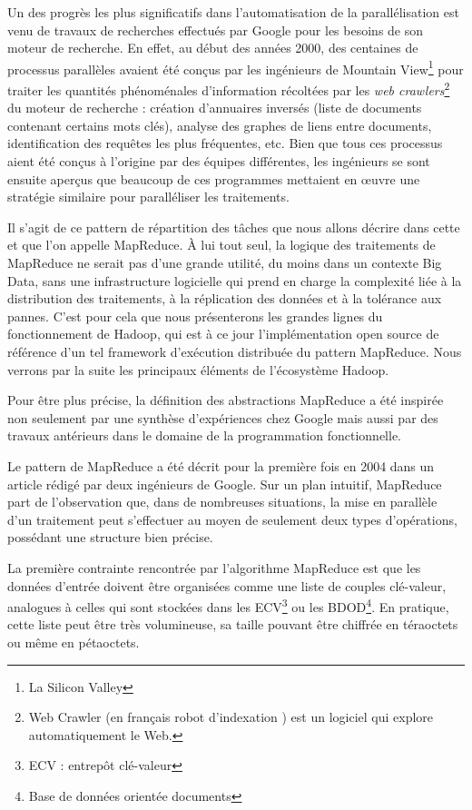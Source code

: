 \documentclass[12pt]{article}
\begin{document}
Un des progrès les plus significatifs dans l’automatisation de la parallélisation est venu de travaux de recherches effectués par Google pour les besoins de son moteur de recherche. 
En effet, au début des années 2000, des centaines de processus parallèles avaient été conçus par les ingénieurs de Mountain View\footnote{La Silicon Valley} pour traiter les quantités phénoménales d’information récoltées par les \emph{web crawlers}\footnote{Web Crawler (en français \og robot d'indexation \fg)  est un logiciel qui explore automatiquement le Web.} du moteur de recherche : création d'annuaires inversés (liste de documents contenant certains mots clés), analyse des graphes de liens entre documents, identification des requêtes les plus fréquentes, etc. Bien que tous ces processus aient été conçus à l’origine par des équipes différentes, les ingénieurs se sont ensuite aperçus que beaucoup de ces programmes mettaient en œuvre une stratégie similaire pour paralléliser les traitements.
\par
Il s'agit de ce pattern de répartition des tâches que nous allons décrire dans cette et que l’on appelle MapReduce. À lui tout seul, la logique des traitements de MapReduce ne serait pas d'une grande utilité, du moins dans un contexte Big Data, sans une infrastructure logicielle qui prend en charge la complexité liée à la distribution des traitements, à la réplication des données et à la tolérance aux pannes. C'est pour cela que nous présenterons les grandes lignes du fonctionnement de Hadoop, qui est à ce jour l’implémentation open source de référence d'un tel framework d'exécution distribuée du pattern MapReduce. Nous verrons par la suite les principaux éléments de l'écosystème Hadoop.
\par
Pour être plus précise, la définition des abstractions MapReduce a été inspirée non seulement par une synthèse d’expériences chez Google mais aussi par des travaux antérieurs dans le domaine de la programmation fonctionnelle.
\par
Le pattern de MapReduce a été décrit pour la première fois en 2004 dans un article rédigé par deux ingénieurs de Google. Sur un plan intuitif, MapReduce part de l'observation que, dans de nombreuses situations, la mise en parallèle d'un traitement peut s'effectuer au moyen de seulement deux types d'opérations, possédant une structure bien précise.
\par
La première contrainte rencontrée par l'algorithme MapReduce est que les données d'entrée doivent être organisées comme une liste de couples clé-valeur, analogues à celles qui sont stockées dans les ECV\footnote{ECV : entrepôt clé-valeur} ou les BDOD\footnote{Base de données orientée documents}. En pratique, cette liste peut être très volumineuse, sa taille pouvant être chiffrée en téraoctets ou même en pétaoctets. \par
\end{document}
